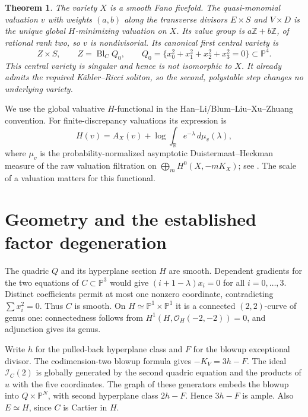 \documentclass[11pt,a4paper]{article}
\newtheorem{theorem}{Theorem}
\newcommand{\Z}{\mathbb Z}
\newcommand{\R}{\mathbb R}
\newcommand{\Bl}{\operatorname{Bl}}
\begin{document}
\begin{theorem}\label{thm:main}
The variety \(X\) is a smooth Fano fivefold. The quasi-monomial valuation
\(v\) with weights \((a,b)\) along the transverse divisors
\(E\times S\) and \(V\times D\) is the unique global \(H\)-minimizing
valuation on \(X\). Its value group is \(a\Z+b\Z\), of rational rank two,
so \(v\) is nondivisorial.
Its canonical first central variety is
\[
 Z\times S,\qquad
 Z=\Bl_C Q_0,\qquad
 Q_0=\{x_0^2+x_1^2+x_2^2+x_3^2=0\}\subset\mathbb P^4.
\]
This central variety is singular and hence is not isomorphic to \(X\).
It already admits the required Kähler--Ricci soliton, so the second,
polystable step changes no underlying variety.
\end{theorem}

We use the global valuative \(H\)-functional in the Han--Li/Blum--Liu--Xu--Zhuang
convention. For finite-discrepancy valuations its expression is
\[
 H(v)=A_X(v)+\log\int_{\R}e^{-\lambda}\,d\mu_v(\lambda),
\]
where \(\mu_v\) is the probability-normalized asymptotic
Duistermaat--Heckman measure of the raw valuation filtration on
\(\bigoplus_m H^0(X,-mK_X)\); see \cite[Definition~4.1]{HL}.
The scale of a valuation matters for this functional.

\section{Geometry and the established factor degeneration}

The quadric \(Q\) and its hyperplane section \(H\) are smooth.
Dependent gradients for the two equations of \(C\subset\mathbb P^3\)
would give \((i+1-\lambda)x_i=0\) for all \(i=0,\ldots,3\).
Distinct coefficients permit at most one nonzero coordinate, contradicting
\(\sum x_i^2=0\). Thus \(C\) is smooth. On \(H\simeq\mathbb P^1\times
\mathbb P^1\) it is a connected \((2,2)\)-curve of genus one:
connectedness follows from \(H^1(H,\mathcal O_H(-2,-2))=0\), and
adjunction gives its genus.

Write \(h\) for the pulled-back hyperplane class and \(F\) for the
blowup exceptional divisor. The codimension-two blowup formula gives
\(-K_V=3h-F\). The ideal \(\mathcal I_C(2)\) is globally generated by
the second quadric equation and the products of \(u\) with the five
coordinates. The graph of these generators embeds the blowup into
\(Q\times\mathbb P^N\), with second hyperplane class \(2h-F\).
Hence \(3h-F\) is ample. Also \(E\simeq H\), since \(C\) is Cartier in
\(H\).
\end{document}
